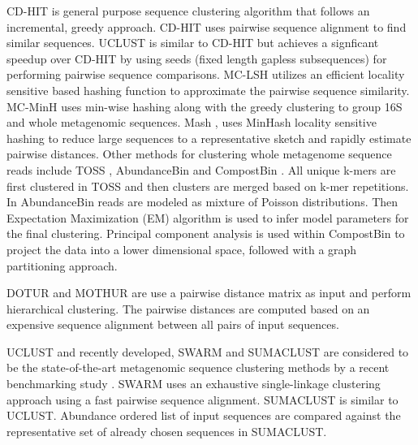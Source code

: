 \documentclass[10pt, conference, compsocconf]{IEEEtran}
\begin{document}
CD-HIT \cite{XXX} is general purpose sequence clustering algorithm that 
follows an incremental, greedy approach. CD-HIT uses pairwise sequence alignment 
to find similar sequences. UCLUST \cite{XXX} is similar to CD-HIT but achieves 
a signficant speedup over CD-HIT by using 
seeds (fixed length gapless subsequences) 
for performing pairwise sequence comparisons. 
%
MC-LSH \cite{MARMetaLSH} utilizes an efficient 
locality sensitive based hashing function 
to approximate the pairwise sequence similarity. 
MC-MinH \cite{MARMcMinH} uses 
min-wise \cite{MARMinWise} hashing along with the 
greedy clustering to group
16S and whole metagenomic sequences. Mash \cite{MAROtherMinH}, uses 
MinHash locality sensitive hashing to 
reduce large sequences to a representative sketch 
and rapidly estimate pairwise distances. Other
methods for clustering whole metagenome sequence
reads include TOSS \cite{MARToss}, AbundanceBin \cite{MARAbundant}
and CompostBin \cite{MARCompost}. All unique k-mers are 
first clustered in TOSS and then 
clusters are merged based on k-mer repetitions. In AbundanceBin 
reads are modeled as mixture of Poisson distributions. Then 
Expectation Maximization (EM) algorithm is used to 
infer model parameters for the 
final clustering. Principal component analysis is used within
CompostBin to project the data into a 
lower dimensional space, followed with a graph partitioning 
approach.  %
%

DOTUR \cite{XXX} and   
MOTHUR \cite{YYY} are 
use a pairwise distance matrix as input and 
perform hierarchical clustering.
%
The pairwise distances are
computed based on an expensive 
sequence alignment 
 between all pairs of input sequences.



UCLUST \cite{xx} and recently developed,  SWARM \cite{MARSwarm}\cite{MARSwarm2} and 
SUMACLUST \cite{MARSumaclust}  are considered to be the state-of-the-art 
metagenomic sequence 
clustering methods by a recent benchmarking study \cite{MARDeNovo}. 
%
SWARM uses an  exhaustive single-linkage 
clustering approach using a fast pairwise 
sequence alignment. SUMACLUST is similar to UCLUST. Abundance ordered 
list of input sequences are compared against the 
representative set of already chosen sequences in SUMACLUST. 
\end{document}
